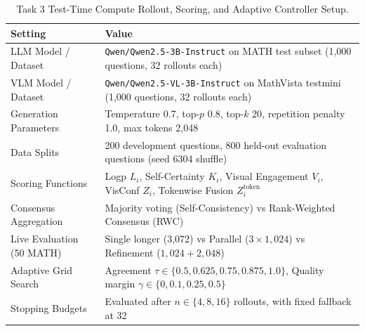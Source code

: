 \documentclass{article}
\begin{document}
\begin{table}[htbp]
    \centering
    \caption{Task 3 Test-Time Compute Rollout, Scoring, and Adaptive Controller Setup.}
    \label{tab:app_t3_setup}
    \small
    \begin{tabular}{ll}
        \toprule
        Setting & Value \\
        \midrule
        LLM Model / Dataset & \texttt{Qwen/Qwen2.5-3B-Instruct} on MATH test subset (1,000 questions, 32 rollouts each) \\
        VLM Model / Dataset & \texttt{Qwen/Qwen2.5-VL-3B-Instruct} on MathVista testmini (1,000 questions, 32 rollouts each) \\
        Generation Parameters & Temperature 0.7, top-$p$ 0.8, top-$k$ 20, repetition penalty 1.0, max tokens 2,048 \\
        Data Splits & 200 development questions, 800 held-out evaluation questions (seed 6304 shuffle) \\
        Scoring Functions & Logp $L_i$, Self-Certainty $K_i$, Visual Engagement $V_i$, VisConf $Z_i$, Tokenwise Fusion $Z_i^{\text{token}}$ \\
        Consensus Aggregation & Majority voting (Self-Consistency) vs Rank-Weighted Consensus (RWC) \\
        Live Evaluation (50 MATH) & Single longer (3,072) vs Parallel ($3\times 1,024$) vs Refinement ($1,024 + 2,048$) \\
        Adaptive Grid Search & Agreement $\tau \in \{0.5, 0.625, 0.75, 0.875, 1.0\}$, Quality margin $\gamma \in \{0, 0.1, 0.25, 0.5\}$ \\
        Stopping Budgets & Evaluated after $n \in \{4, 8, 16\}$ rollouts, with fixed fallback at 32 \\
        \bottomrule
    \end{tabular}
\end{table}
\end{document}
